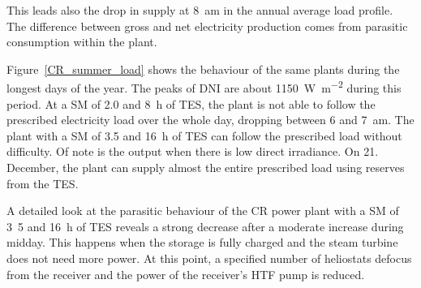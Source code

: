 This leads also the drop in supply at \SI{8}{am} in the annual average load profile. The difference between gross and net electricity production comes from parasitic consumption within the plant.

Figure~\ref{CR_summer_load} shows the behaviour of the same plants during the longest days of the year. The peaks of \ac{DNI} are about \SI{1150}{\watt\per\square\metre} during this period. At a \ac{SM} of 2.0 and \SI{8}{h} of \ac{TES}, the plant is not able to follow the prescribed electricity load over the whole day, dropping between 6 and \SI{7}{am}. The plant with a \ac{SM} of 3.5 and \SI{16}{h} of \ac{TES} can follow the prescribed load without difficulty. Of note is the output when there is low direct irradiance. On 21. December, the plant can supply almost the entire prescribed load using reserves from the \ac{TES}.


A detailed look at the parasitic behaviour of the \ac{CR} power plant with a \ac{SM} of \si{3.5} and \SI{16}{h} of \ac{TES} reveals a strong decrease after a moderate increase during midday. This happens when the storage is fully charged and the steam turbine does not need more power. At this point, a specified number of heliostats defocus from the receiver and the power of the receiver's \ac{HTF} pump is reduced. 

